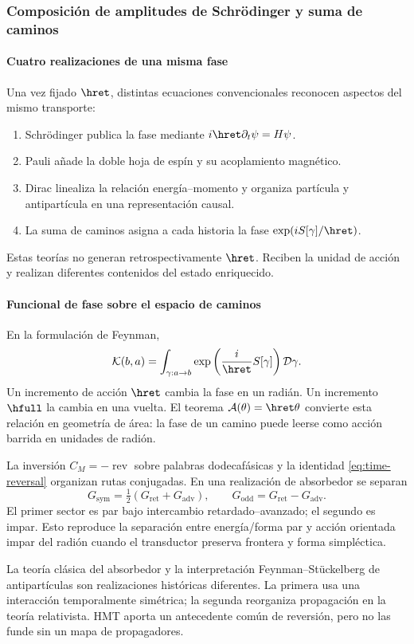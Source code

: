 \subsubsection{Composición de amplitudes de Schrödinger y suma de caminos}

\paragraph{Cuatro realizaciones de una misma fase}

Una vez fijado \(\hret\), distintas ecuaciones convencionales reconocen
aspectos del mismo transporte:
\begin{enumerate}
\item Schrödinger publica la fase mediante
\(i\hret\partial_t\psi=H\psi\).
\item Pauli añade la doble hoja de espín y su acoplamiento magnético.
\item Dirac linealiza la relación energía--momento y organiza partícula y
antipartícula en una representación causal.
\item La suma de caminos asigna a cada historia la fase
\(\exp(iS[\gamma]/\hret)\).
\end{enumerate}
Estas teorías no generan retrospectivamente \(\hret\). Reciben la unidad de
acción y realizan diferentes contenidos del estado enriquecido.

\paragraph{Funcional de fase sobre el espacio de caminos}

En la formulación de Feynman,
\begin{equation}
\mathcal K(b,a)=\int_{\gamma:a\to b}
\exp\left(\frac{i}{\hret}S[\gamma]\right)\mathcal D\gamma.
\label{eq:path-integral}
\end{equation}
Un incremento de acción \(\hret\) cambia la fase en un radián. Un incremento
\(\hfull\) la cambia en una vuelta. El teorema
\(\mathcal A(\theta)=\hret\theta\) convierte esta relación en geometría de
área: la fase de un camino puede leerse como acción barrida en unidades de
radión.

La inversión \(C_M=-\operatorname{rev}\) sobre palabras dodecafásicas y la
identidad \eqref{eq:time-reversal} organizan rutas conjugadas. En una
realización de absorbedor se separan
\[
G_{\mathrm{sym}}=\tfrac12(G_{\mathrm{ret}}+G_{\mathrm{adv}}),
\qquad
G_{\mathrm{odd}}=G_{\mathrm{ret}}-G_{\mathrm{adv}}.
\]
El primer sector es par bajo intercambio retardado--avanzado; el segundo es
impar. Esto reproduce la separación entre energía/forma par y acción
orientada impar del radión cuando el transductor preserva frontera y forma
simpléctica.

\begin{statusbox}
La teoría clásica del absorbedor y la interpretación Feynman--Stückelberg de
antipartículas son realizaciones históricas diferentes. La primera usa una
interacción temporalmente simétrica; la segunda reorganiza propagación en la
teoría relativista. HMT aporta un antecedente común de reversión, pero no las
funde sin un mapa de propagadores.
\end{statusbox}
